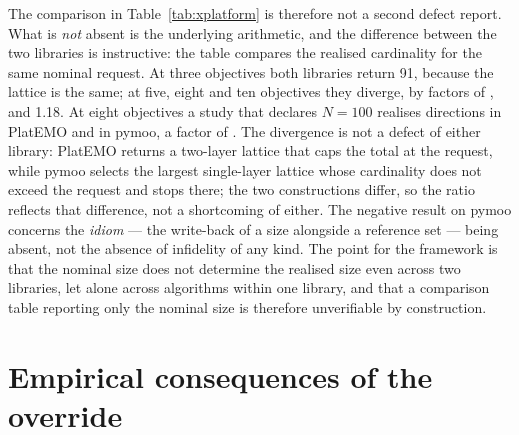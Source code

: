 \documentclass{SCIS2026}
\begin{document}
The comparison in Table~\ref{tab:xplatform} is therefore not a second defect report. What is \emph{not} absent is the underlying arithmetic, and the difference between the two libraries is instructive: the table compares the realised cardinality for the same nominal request. At three objectives both libraries return 91, because the lattice is the same; at five, eight and ten objectives they diverge, by factors of \xRatioFive{}, \xRatioEight{} and 1.18. At eight objectives a study that declares $N=100$ realises \nPlatMeight{} directions in PlatEMO and \nPymoMeight{} in pymoo, a factor of \xRatioEight{}. The divergence is not a defect of either library: PlatEMO returns a two-layer lattice that caps the total at the request, while pymoo selects the largest single-layer lattice whose cardinality does not exceed the request and stops there; the two constructions differ, so the ratio reflects that difference, not a shortcoming of either. The negative result on pymoo concerns the \emph{idiom} --- the write-back of a size alongside a reference set --- being absent, not the absence of infidelity of any kind. The point for the framework is that the nominal size does not determine the realised size even across two libraries, let alone across algorithms within one library, and that a comparison table reporting only the nominal size is therefore unverifiable by construction.

\begin{table}[!t]
\centering
\footnotesize
\caption{Realised cardinality of the reference set at a nominal target of 100 directions (and 200 in the last column) in two libraries. The first row gives the nominal target, the second the number of objectives; the last row is the PlatEMO value divided by the pymoo value. PlatEMO returns a two-layer lattice capped at the target, pymoo the largest single-layer lattice not exceeding it, so the ratio describes a difference in construction, not a defect of either}
\label{tab:xplatform}

\end{table}

\section{Empirical consequences of the override}
\label{sec:exp}
\end{document}
